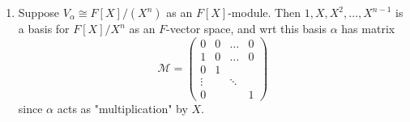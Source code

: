 \documentclass[egregdoesnotlikesansseriftitles,a4paper]{scrartcl}
\begin{document}
\begin{example*}
        \begin{enumerate}
               \item Suppose $V_{\alpha} \cong F[X]/ (X^{n})$ as an $F[X]$-module. Then $1, X, X^2, \ldots,X^{n-1}$ is a basis for $F[X]/X^{n} $ as an $F$-vector space, and wrt this basis $\alpha$ has matrix \[
               \mathcal{M}=\begin{pmatrix} 0 &0 &\ldots& 0 \\ 1 &0 &\ldots &0 \\ 0 &1 & & \\\vdots  & &\ddots & \\ 0 & & &1\end{pmatrix}
               \] since $\alpha$ acts as "multiplication" by $X$.
        \end{enumerate}
\end{example*}
\end{document}
